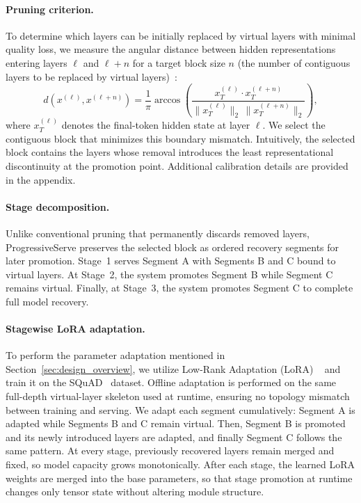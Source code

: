 \documentclass[sigplan,anonymous,review,nonacm]{acmart}
\begin{document}
\paragraph{Pruning criterion.}
To determine which layers can be initially replaced by virtual layers with minimal quality loss, we measure the angular distance between hidden representations entering layers $\ell$ and $\ell+n$ for a target block size $n$ (the number of contiguous layers to be replaced by virtual layers)~\cite{gromov2024deeperlayers}:
\begin{equation}
d\!\left(x^{(\ell)}, x^{(\ell+n)}\right)
=
\frac{1}{\pi}
\arccos\!\left(
\frac{x_T^{(\ell)} \cdot x_T^{(\ell+n)}}
{\|x_T^{(\ell)}\|_2 \, \|x_T^{(\ell+n)}\|_2}
\right),
\end{equation}
where $x_T^{(\ell)}$ denotes the final-token hidden state at layer $\ell$. We select the contiguous block that minimizes this boundary mismatch. Intuitively, the selected block contains the layers whose removal introduces the least representational discontinuity at the promotion point. Additional calibration details are provided in the appendix.

\paragraph{Stage decomposition.}
Unlike conventional pruning that permanently discards removed layers, ProgressiveServe preserves the selected block as ordered recovery segments for later promotion. Stage~1 serves Segment A with Segments B and C bound to virtual layers. At Stage~2, the system promotes Segment B while Segment C remains virtual. Finally, at Stage~3, the system promotes Segment C to complete full model recovery.

\paragraph{Stagewise LoRA adaptation.}
To perform the parameter adaptation mentioned in Section~\ref{sec:design_overview}, we utilize Low-Rank Adaptation (LoRA) ~\cite{lora} and train it on the SQuAD~\cite{rajpurkar-etal-2016-squad} dataset. Offline adaptation is performed on the same full-depth virtual-layer skeleton used at runtime, ensuring no topology mismatch between training and serving. We adapt each segment cumulatively: Segment A is adapted while Segments B and C remain virtual. Then, Segment B is promoted and its newly introduced layers are adapted, and finally Segment C follows the same pattern. At every stage, previously recovered layers remain merged and fixed, so model capacity grows monotonically. After each stage, the learned LoRA weights are merged into the base parameters, so that stage promotion at runtime changes only tensor state without altering module structure.
\end{document}
